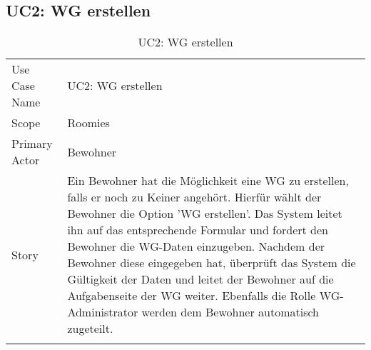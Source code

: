 \subsection{UC2: WG erstellen}
\begin{table}[H]
	\tablestyle
	\tablealtcolored
	\begin{tabularx}{\textwidth}{lX}
		\tablebody
			Use Case Name &
			UC2: WG erstellen
			\tabularnewline
			Scope &
			Roomies
			\tabularnewline
			Primary Actor &
			Bewohner
			\tabularnewline
			Story &
			Ein Bewohner hat die Möglichkeit eine WG zu erstellen, falls er noch zu Keiner angehört. Hierfür wählt der Bewohner die Option 'WG erstellen'. Das System leitet ihn auf das entsprechende Formular und fordert den Bewohner die WG-Daten einzugeben. Nachdem der Bewohner diese eingegeben hat, überprüft das System die Gültigkeit der Daten und leitet der Bewohner auf die Aufgabenseite der WG weiter. Ebenfalls die Rolle WG-Administrator werden dem Bewohner automatisch zugeteilt.
			\tabularnewline
		\tableend
	\end{tabularx}
	\caption{UC2: WG erstellen}
\end{table}


